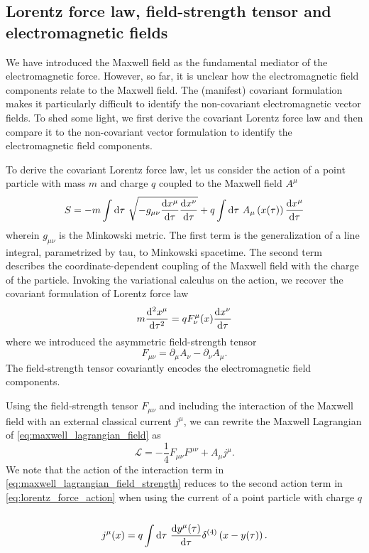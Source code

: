 \subsection{Lorentz force law, field-strength tensor and electromagnetic fields}

We have introduced the Maxwell field as the fundamental mediator of the electromagnetic force.
However, so far, it is unclear how the electromagnetic field components relate to the Maxwell field.
The (manifest) covariant formulation makes it particularly difficult to identify the non-covariant electromagnetic vector fields.
To shed some light, we first derive the covariant Lorentz force law and then compare it to the non-covariant vector formulation to identify the electromagnetic field components.

To derive the covariant Lorentz force law, let us consider the action of a point particle with mass $m$ and charge $q$ coupled to the Maxwell field $A^\mu$~\cite[p.~244]{Zee2013}
\begin{equation}
	S
	=
	-
	m\int\dd{\tau}
	\sqrt{-g_{\mu\nu}\odv{x^\mu}{\tau}\odv{x^\nu}{\tau}}
	+
	q\int\dd{\tau}
	A_\mu\left(x(\tau)\right)
	\odv{x^\mu}{\tau}
	\label{eq:lorentz_force_action}
\end{equation}
wherein $g_{\mu\nu}$ is the Minkowski metric.
The first term is the generalization of a line integral, parametrized by tau, to Minkowski spacetime.
The second term describes the coordinate-dependent coupling of the Maxwell field with the charge of the particle.
Invoking the variational calculus on the action, we recover the covariant formulation of Lorentz force law
\begin{equation}
	m
	\odv[order={2}]{x^\mu}{\tau}
	=
	qF^\mu_\nu(x)\odv{x^\nu}{\tau}
	\label{eq:covariant_lorentz_force}
\end{equation}
where we introduced the asymmetric field-strength tensor
\begin{equation}
	F_{\mu\nu}
	=
	\partial_\mu
	A_\nu
	-
	\partial_\nu
	A_\mu
	\label{eq:field_strength_tensor}
	.
\end{equation}
The field-strength tensor covariantly encodes the electromagnetic field components.

Using the field-strength tensor $F_{\mu\nu}$ and including the interaction of the Maxwell field with an external classical current $j^\mu$, we can rewrite the Maxwell Lagrangian of \cref{eq:maxwell_lagrangian_field} as
\begin{equation}
	\mathcal{L}
	=
	-
	\frac{1}{4}
	F_{\mu\nu}
	F^{\mu\nu}
	+
	A_\mu j^\mu
	\label{eq:maxwell_lagrangian_field_strength}
	.
\end{equation}
We note that the action of the interaction term in \cref{eq:maxwell_lagrangian_field_strength} reduces to the second action term in \cref{eq:lorentz_force_action} when using the current of a point particle with charge $q$~\cite[p.~177]{Peskin1995}
\begin{equation}
	j^\mu(x)
	=
	q
	\int\dd{\tau}
	\odv{y^\mu(\tau)}{\tau}
	\delta^{(4)}\left(x-y(\tau)\right)
	.
\end{equation}

